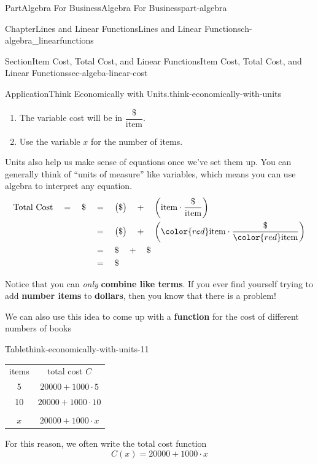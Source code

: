 \documentclass{tufte-book}
\newcommand{\tabularfont}{\relax}
\newcommand{\terminology}[1]{\textbf{#1}}
\numberwithin{equation}{chapter}
\begin{document}
\begin{partptx}{Part}{Algebra For Business}{}{Algebra For Business}{}{}{part-algebra}
\begin{chapterptx}{Chapter}{Lines and Linear Functions}{}{Lines and Linear Functions}{}{}{ch-algebra_linearfunctions}
\begin{sectionptx}{Section}{Item Cost, Total Cost, and Linear Functions}{}{Item Cost, Total Cost, and Linear Functions}{}{}{sec-algeba-linear-cost}
\begin{insight}{Application}{Think Economically with Units.}{think-economically-with-units}
\begin{enumerate}
\item{}The variable cost will be in \(\dfrac{\$}{\text{item}}\).%
\item{}Use the variable \(x\) for the number of items.%
\end{enumerate}
%
\par
Units also help us make sense of equations once we've set them up. You can generally think of ``units of measure'' like variables, which means you can use algebra to interpret any equation.%
\begin{equation*}
\begin{aligned}
\text{Total Cost} \quad = \quad \$ 
&\quad =\quad 
\big(\$\big)\quad +\quad \left( \text{item}\cdot\dfrac{\$}{\text{item}}\right)
\\
&\quad =\quad 
\big(\$\big)\quad +\quad \left(  {\color{red}\text{item}}\cdot\dfrac{\$}{{\color{red}\text{item}}}\right) 
\\
&\quad =\quad 
\$\quad + \quad \$
\\ 
&\quad =\quad
\$\end{aligned}
\end{equation*}
%
\par
Notice that you can \emph{only} \terminology{combine like terms}. If you ever find yourself trying to add \terminology{number items} to \terminology{dollars}, then you know that there is a problem!%
\par
We can also use this idea to come up with a \terminology{function} for the cost of different numbers of books%
\begin{tableptx}{Table}{\textbf{}}{think-economically-with-units-11}{}%
\centering%
{\tabularfont%
\begin{tabular}{ll}
\multicolumn{1}{c}{items}&\multicolumn{1}{c}{total cost \(C\)}\tabularnewline[0pt]
\multicolumn{1}{c}{5}&\multicolumn{1}{c}{\(20000 + 1000\cdot 5\)}\tabularnewline[0pt]
\multicolumn{1}{c}{10}&\multicolumn{1}{c}{\(20000 + 1000\cdot 10\)}\tabularnewline[0pt]
\multicolumn{1}{c}{}&\multicolumn{1}{c}{}\tabularnewline[0pt]
\multicolumn{1}{c}{\(x\)}&\multicolumn{1}{c}{\(20000 + 1000\cdot x\)}
\end{tabular}
}%
\end{tableptx}%
For this reason, we often write the total cost function%
\begin{equation*}
C(x) = 20000 + 1000\cdot x
\end{equation*}
%
\end{insight}
\end{sectionptx}
%
%
\typeout{************************************************}

\end{chapterptx}
\end{partptx}
\end{document}
